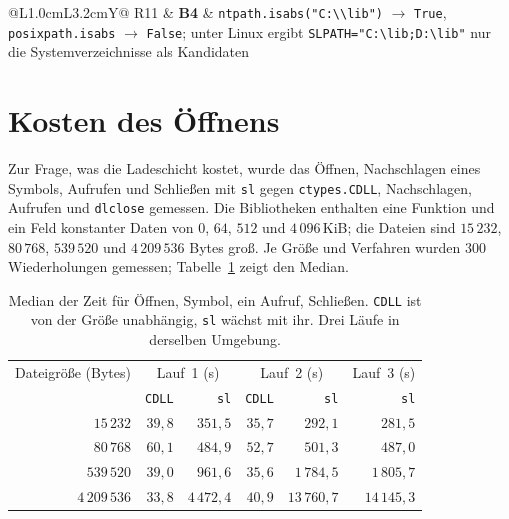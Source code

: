 \documentclass[a4paper,12pt,twoside]{report}
\DeclareRobustCommand{\_}{\ifmmode\mbox{\textunderscore}\else\textunderscore\allowbreak{}\fi}
\theoremstyle{definition}
\newcommand{\Bf}[1]{\textbf{B#1}}
\begin{document}
\begin{table}[!ht]
\begin{tabularx}{\textwidth}{@{}L{1.0cm}L{3.2cm}Y@{}}
		R11 & \Bf{4} & \texttt{ntpath.isabs("C:\textbackslash\textbackslash lib")} $\to$ \texttt{True}, \texttt{posixpath.isabs} $\to$ \texttt{False}; unter Linux ergibt \texttt{SL\_PATH="C:\textbackslash lib;D:\textbackslash lib"} nur die Systemverzeichnisse als Kandidaten \\
		\bottomrule
	\end{tabularx}
	\caption{Reproduktionen. Die Nummern der Befunde verweisen auf Kapitel~\ref{chap:befunde}.}
	\label{tab:repro}
\end{table}

\section{Kosten des Öffnens}
\label{sec:kosten}

Zur Frage, was die Ladeschicht kostet, wurde das Öffnen, Nachschlagen eines Symbols, Aufrufen und Schließen mit \texttt{sl} gegen \texttt{ctypes.CDLL}, Nachschlagen, Aufrufen und \texttt{dlclose} gemessen. Die Bibliotheken enthalten eine Funktion und ein Feld konstanter Daten von $0$, $64$, $512$ und $4\,096$\,KiB; die Dateien sind $15\,232$, $80\,768$, $539\,520$ und $4\,209\,536$ Bytes groß. Je Größe und Verfahren wurden $300$ Wiederholungen gemessen; Tabelle~\ref{tab:kosten} zeigt den Median.

\begin{table}[!ht]
	\centering
	\small
	\begin{tabular}{@{}rrrrrr@{}}
		\toprule
		Dateigröße (Bytes) & \multicolumn{2}{c}{Lauf~1 (\textmu s)} & \multicolumn{2}{c}{Lauf~2 (\textmu s)} & Lauf~3 (\textmu s) \\
		& \texttt{CDLL} & \texttt{sl} & \texttt{CDLL} & \texttt{sl} & \texttt{sl} \\
		\midrule
		$15\,232$ & $39{,}8$ & $351{,}5$ & $35{,}7$ & $292{,}1$ & $281{,}5$ \\
		$80\,768$ & $60{,}1$ & $484{,}9$ & $52{,}7$ & $501{,}3$ & $487{,}0$ \\
		$539\,520$ & $39{,}0$ & $961{,}6$ & $35{,}6$ & $1\,784{,}5$ & $1\,805{,}7$ \\
		$4\,209\,536$ & $33{,}8$ & $4\,472{,}4$ & $40{,}9$ & $13\,760{,}7$ & $14\,145{,}3$ \\
		\bottomrule
	\end{tabular}
	\caption{Median der Zeit für Öffnen, Symbol, ein Aufruf, Schließen. \texttt{CDLL} ist von der Größe unabhängig, \texttt{sl} wächst mit ihr. Drei Läufe in derselben Umgebung.}
	\label{tab:kosten}
\end{table}
\end{document}

